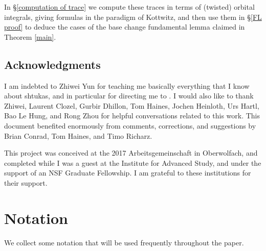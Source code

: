 \documentclass[reqno]{amsart}
\numberwithin{equation}{section}
\theoremstyle{remark}
\numberwithin{equation}{section}
\begin{document}
 In \S \ref{computation of trace} we compute these traces in terms of (twisted) orbital integrals, giving formulas in the paradigm of Kottwitz, and then use them in \S \ref{FL proof} to deduce the cases of the base change fundamental lemma claimed in Theorem \ref{main}. 


\subsection{Acknowledgments}


I am indebted to Zhiwei Yun for teaching me basically everything that I know about shtukas, and in particular for directing me to \cite{Ngo06}. I would also like to thank Zhiwei, Laurent Clozel, Gurbir Dhillon, Tom Haines, Jochen Heinloth, Urs Hartl, Bao Le Hung, and Rong Zhou for helpful conversations related to this work. This document benefited enormously from comments, corrections, and suggestions by Brian Conrad, Tom Haines, and Timo Richarz.


This project was conceived at the 2017 Arbeitsgemeinschaft in Oberwolfach, and completed while I was a guest at the Institute for Advanced Study, and under the support of an NSF Graduate Fellowship. I am grateful to these institutions for their support. 

\section{Notation}

We collect some notation that will be used frequently throughout the paper.
\end{document}
